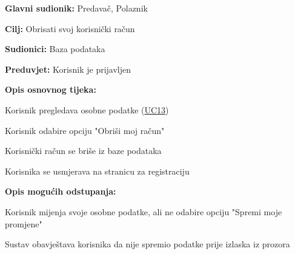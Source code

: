 			\begin{packed_item}
				
				\item \textbf{Glavni sudionik:} Predavač, Polaznik
				\item  \textbf{Cilj:} Obrisati svoj korisnički račun
				\item  \textbf{Sudionici:} Baza podataka
				\item  \textbf{Preduvjet:} Korisnik je prijavljen
				\item  \textbf{Opis osnovnog tijeka:}
				
				\item[] \begin{packed_enum}
					
					\item Korisnik pregledava osobne podatke (\hyperref[UC13] {UC13})
					\item Korisnik odabire opciju "Obriši moj račun"
					\item Korisnički račun se briše iz baze podataka
					\item Korisnika se usmjerava na stranicu za registraciju
					
				\end{packed_enum}
				\item  \textbf{Opis mogućih odstupanja:}
				
				\item[] \begin{packed_item}
					
					\item[2.a] Korisnik mijenja svoje osobne podatke, ali ne odabire opciju "Spremi moje promjene"
					\item[] \begin{packed_enum}
						
						\item Sustav obavještava korisnika da nije spremio podatke prije izlaska iz prozora
						
					\end{packed_enum}
					
				\end{packed_item}
				
			\end{packed_item}
			\noindent {}
